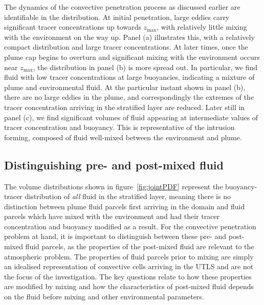\documentclass[a4paper]{article}
\begin{document}
The dynamics of the convective penetration process as discussed earlier are identifiable in the distribution. At
initial penetration, large eddies carry significant tracer concentrations up towards $z_{\max}$, with
relatively little mixing with the environment on the way up. Panel (a) illustrates this, with a relatively
compact distribution and large tracer concentrations. At later times, once the plume cap begins to overturn
and significant mixing with the environment occurs near $z_{\max}$, the distribution in panel (b) is more
spread out. In particular, we find fluid with low tracer concentrations at large buoyancies, indicating a
mixture of plume and environmental fluid. At the particular instant shown in panel (b), there are no
large eddies in the plume, and correspondingly the extremes of the tracer concentration arriving in the
stratified layer are reduced. Later still in panel (c), we find significant volumes of fluid appearing at
intermediate values of tracer concentration and buoyancy. This is representative of the intrusion forming,
composed of fluid well-mixed between the environment and plume.

\subsection{Distinguishing pre- and post-mixed fluid}
\label{sec:jointPDF}

The volume distributions shown in figure~\ref{fig:jointPDF} represent the buoyancy-tracer distribution of \emph{all}
fluid in the stratified layer, meaning there is no distinction between plume fluid parcels first arriving in
the domain and fluid parcels which have mixed with the environment and had their tracer concentration and
buoyancy modified as a result. For the convective penetration problem at hand, it is important to distinguish
between these pre- and post-mixed fluid parcels, as the properties of the post-mixed fluid are relevant
to the atmospheric problem. The properties of fluid parcels prior to mixing are simply an idealised
representation of convective cells arriving in the UTLS and are not the focus of the investigation. The key
questions relate to how these properties are modified by mixing and how the characteristics of post-mixed fluid
depends on the fluid before mixing and other environmental parameters.
\end{document}
